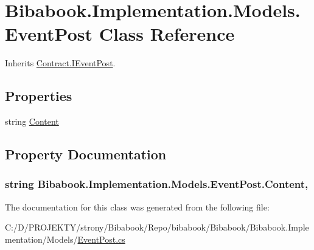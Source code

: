 \hypertarget{class_bibabook_1_1_implementation_1_1_models_1_1_event_post}{}\section{Bibabook.\+Implementation.\+Models.\+Event\+Post Class Reference}
\label{class_bibabook_1_1_implementation_1_1_models_1_1_event_post}


Inherits \hyperlink{interface_contract_1_1_i_event_post}{Contract.\+I\+Event\+Post}.

\subsection*{Properties}
\begin{DoxyCompactItemize}
\item 
string \hyperlink{class_bibabook_1_1_implementation_1_1_models_1_1_event_post_a7a2dfebf9805e262a2843d5d949d2280}{Content}
\end{DoxyCompactItemize}


\subsection{Property Documentation}
\hypertarget{class_bibabook_1_1_implementation_1_1_models_1_1_event_post_a7a2dfebf9805e262a2843d5d949d2280}{}
\subsubsection[{Content}]{\setlength{\rightskip}{0pt plus 5cm}string Bibabook.\+Implementation.\+Models.\+Event\+Post.\+Content\hspace{0.3cm}{\ttfamily [get]}, {\ttfamily [set]}}\label{class_bibabook_1_1_implementation_1_1_models_1_1_event_post_a7a2dfebf9805e262a2843d5d949d2280}


The documentation for this class was generated from the following file\+:\begin{DoxyCompactItemize}
\item 
C\+:/\+D/\+P\+R\+O\+J\+E\+K\+T\+Y/strony/\+Bibabook/\+Repo/bibabook/\+Bibabook/\+Bibabook.\+Implementation/\+Models/\hyperlink{_event_post_8cs}{Event\+Post.\+cs}\end{DoxyCompactItemize}
